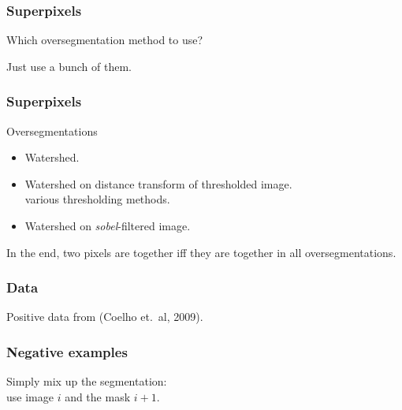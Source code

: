 \documentclass{beamer}
\begin{document}
\begin{frame}[fragile]
\frametitle{Superpixels}

Which oversegmentation method to use?
\pause
\bigskip

Just use a bunch of them.
\end{frame}

\begin{frame}[fragile]
\frametitle{Superpixels}

\begin{block}{Oversegmentations}
\begin{itemize}
\item Watershed.
\item Watershed on distance transform of thresholded image.\\
\hspace{4em} various thresholding methods.
\item Watershed on \textit{sobel\/}-filtered image.
\end{itemize}
\end{block}

\pause
In the end, \alert{two pixels are together iff they are together in all oversegmentations.}

\end{frame}

\begin{frame}[fragile]
\frametitle{Data}

Positive data from (Coelho et.\ al, 2009).

\end{frame}

\begin{frame}[fragile]
\frametitle{Negative examples}

Simply mix up the segmentation:\\
use image $i$ and the mask $i+1$.
\end{frame}
\end{document}
